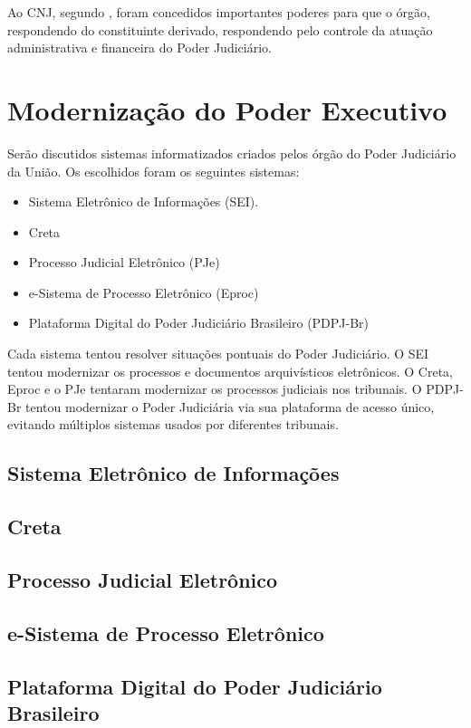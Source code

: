 Ao CNJ, segundo \cite{silva2013transparencia}, foram concedidos importantes poderes para que o órgão, respondendo do constituinte derivado, respondendo pelo controle da atuação administrativa e financeira do Poder Judiciário.

\section{Modernização do Poder Executivo}   


Serão discutidos sistemas informatizados criados pelos órgão do Poder Judiciário da União. Os escolhidos foram os seguintes sistemas:

\begin{itemize}
	\item Sistema Eletrônico de Informações (SEI).
	\item Creta
	\item Processo Judicial Eletrônico (PJe)
	\item e-Sistema de Processo Eletrônico (Eproc)
	\item Plataforma Digital do Poder Judiciário Brasileiro (PDPJ-Br)
\end{itemize}

Cada sistema tentou resolver situações pontuais do Poder Judiciário. O SEI tentou modernizar os processos e documentos arquivísticos eletrônicos. O Creta, Eproc e o PJe tentaram modernizar os processos judiciais nos tribunais. O PDPJ-Br tentou modernizar o Poder Judiciária via sua plataforma de acesso único, evitando múltiplos sistemas usados por diferentes tribunais. 

\subsection{Sistema Eletrônico de Informações}

\subsection{Creta}

\subsection{Processo Judicial Eletrônico}

\subsection{e-Sistema de Processo Eletrônico}

\subsection{Plataforma Digital do Poder Judiciário Brasileiro}




